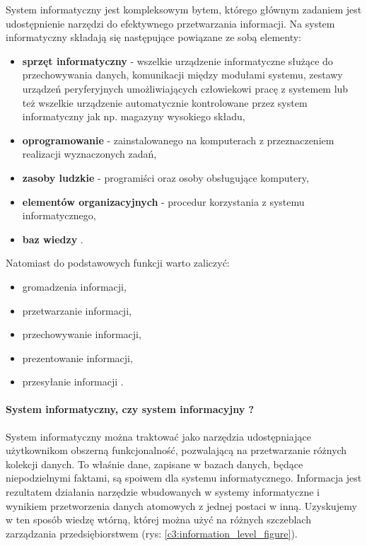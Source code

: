 		System informatyczny jest kompleksowym bytem, którego głównym zadaniem jest udostępnienie
		narzędzi do efektywnego przetwarzania informacji. Na system informatyczny składają się
		następujące powiązane ze sobą elementy:
		\begin{itemize}
			\item \textbf{sprzęt informatyczny} - wszelkie urządzenie informatyczne służące
			do przechowywania danych, komunikacji między modułami systemu, zestawy urządzeń
			peryferyjnych umożliwiających człowiekowi pracę z systemem lub też wszelkie urządzenie
			automatycznie kontrolowane przez system informatyczny jak np. magazyny wysokiego składu,
			\item \textbf{oprogramowanie} - zainstalowanego na komputerach z przeznaczeniem realizacji
			wyznaczonych zadań,
			\item \textbf{zasoby ludzkie} - programiści oraz osoby obsługujące komputery,
			\item \textbf{elementów organizacyjnych} - procedur korzystania z systemu informatycznego,
			\item \textbf{baz wiedzy} \cite{logistyka_w_przedsiebiorstwie}.
		\end{itemize}
		Natomiast do podstawowych funkcji warto zaliczyć:
		\begin{itemize}
			\item gromadzenia informacji,
			\item przetwarzanie informacji,
			\item przechowywanie informacji,
			\item prezentowanie informacji,
			\item przesyłanie informacji \cite{logistyka_w_przedsiebiorstwie}.
		\end{itemize}
		
		\paragraph{System informatyczny, czy system informacyjny ?}
		System informatyczny można traktować jako narzędzia udostępniające użytkownikom 
		obszerną funkcjonalność, pozwalającą na przetwarzanie różnych kolekcji danych.
		To właśnie dane, zapisane w bazach danych, będące niepodzielnymi faktami, są 
		spoiwem dla systemu informatycznego. Informacja jest rezultatem działania
		narzędzie wbudowanych w systemy informatyczne i wynikiem przetworzenia danych 
		atomowych z jednej postaci w inną. Uzyskujemy w ten sposób wiedzę wtórną, której można 
		użyć na różnych szczeblach zarządzania przedsiębiorstwem (rys: \ref{c3:information_level_figure}). \\
		
